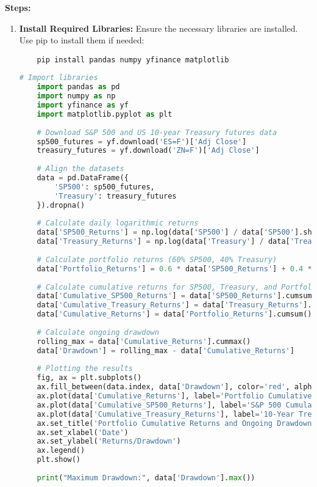 \documentclass{article}
\begin{document}
\textbf{Steps:}
\begin{enumerate}
    \item \textbf{Install Required Libraries:} Ensure the necessary libraries are installed. Use pip to install them if needed:
    \begin{verbatim}
    pip install pandas numpy yfinance matplotlib
    \end{verbatim}

    \begin{lstlisting}[language=Python]
    # Import libraries
    import pandas as pd
    import numpy as np
    import yfinance as yf
    import matplotlib.pyplot as plt
    
    # Download S&P 500 and US 10-year Treasury futures data
    sp500_futures = yf.download('ES=F')['Adj Close']
    treasury_futures = yf.download('ZN=F')['Adj Close']
    
    # Align the datasets
    data = pd.DataFrame({
        'SP500': sp500_futures,
        'Treasury': treasury_futures
    }).dropna()
    
    # Calculate daily logarithmic returns
    data['SP500_Returns'] = np.log(data['SP500'] / data['SP500'].shift(1))
    data['Treasury_Returns'] = np.log(data['Treasury'] / data['Treasury'].shift(1))
    
    # Calculate portfolio returns (60% SP500, 40% Treasury)
    data['Portfolio_Returns'] = 0.6 * data['SP500_Returns'] + 0.4 * data['Treasury_Returns']
    
    # Calculate cumulative returns for SP500, Treasury, and Portfolio
    data['Cumulative_SP500_Returns'] = data['SP500_Returns'].cumsum()
    data['Cumulative_Treasury_Returns'] = data['Treasury_Returns'].cumsum()
    data['Cumulative_Returns'] = data['Portfolio_Returns'].cumsum()
    
    # Calculate ongoing drawdown
    rolling_max = data['Cumulative_Returns'].cummax()
    data['Drawdown'] = rolling_max - data['Cumulative_Returns']
    
    # Plotting the results
    fig, ax = plt.subplots()
    ax.fill_between(data.index, data['Drawdown'], color='red', alpha=0.3)
    ax.plot(data['Cumulative_Returns'], label='Portfolio Cumulative Returns')
    ax.plot(data['Cumulative_SP500_Returns'], label='S&P 500 Cumulative Returns', linestyle='--', linewidth=0.5)
    ax.plot(data['Cumulative_Treasury_Returns'], label='10-Year Treasury Cumulative Returns', linestyle='--', linewidth=0.5)
    ax.set_title('Portfolio Cumulative Returns and Ongoing Drawdown')
    ax.set_xlabel('Date')
    ax.set_ylabel('Returns/Drawdown')
    ax.legend()
    plt.show()
    
    print("Maximum Drawdown:", data['Drawdown'].max())
    \end{lstlisting}
\end{enumerate}
\end{document}
